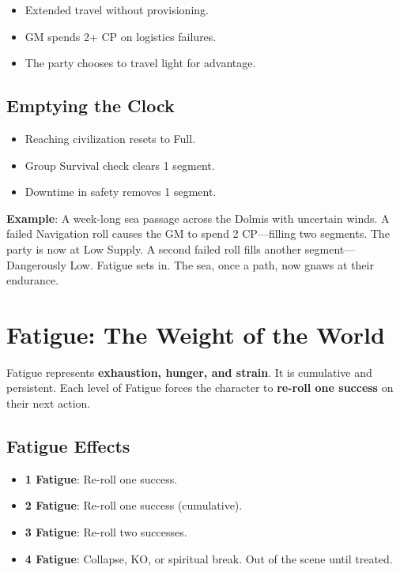 \begin{itemize}
    \item Extended travel without provisioning.
    \item GM spends 2+ CP on logistics failures.
    \item The party chooses to travel light for advantage.
\end{itemize}

\subsection*{Emptying the Clock}

\begin{itemize}
    \item Reaching civilization resets to Full.
    \item Group Survival check clears 1 segment.
    \item Downtime in safety removes 1 segment.
\end{itemize}

\textbf{Example}: A week-long sea passage across the Dolmis with uncertain winds. A failed Navigation roll causes the GM to spend 2 CP—filling two segments. The party is now at Low Supply. A second failed roll fills another segment—Dangerously Low. Fatigue sets in. The sea, once a path, now gnaws at their endurance.

\section*{Fatigue: The Weight of the World}

Fatigue represents \textbf{exhaustion, hunger, and strain}. It is cumulative and persistent. Each level of Fatigue forces the character to \textbf{re-roll one success} on their next action.

\subsection*{Fatigue Effects}

\begin{itemize}
    \item \textbf{1 Fatigue}: Re-roll one success.
    \item \textbf{2 Fatigue}: Re-roll one success (cumulative).
    \item \textbf{3 Fatigue}: Re-roll two successes.
    \item \textbf{4 Fatigue}: Collapse, KO, or spiritual break. Out of the scene until treated.
\end{itemize}

